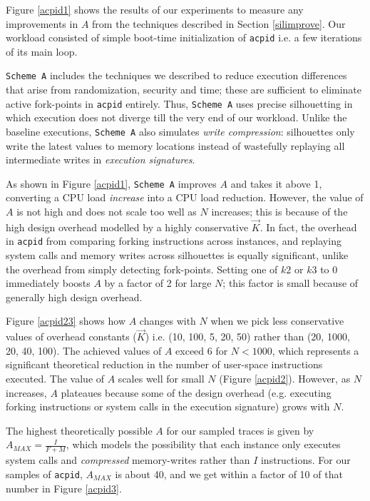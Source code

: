 \newpage
\noindent Figure \ref {acpid1} shows the results of our experiments
to measure any improvements in $A$ from the techniques described in Section \ref{silimprove}.
Our workload consisted of simple boot-time initialization of \texttt{acpid}
i.e. a few iterations of its main loop. 

\texttt{Scheme A} includes the techniques we described to reduce
execution differences that arise from randomization, security and time;
these are sufficient to eliminate active fork-points in \texttt{acpid}
entirely. Thus, \texttt{Scheme A} uses precise silhouetting
in which execution does not diverge till the very end of our workload.
Unlike the baseline executions, \texttt{Scheme A} also simulates {\em write compression}:
silhouettes only write the latest values to memory locations instead of wastefully
replaying all intermediate writes  in {\em execution signatures}.

As shown in Figure \ref{acpid1}, \texttt{Scheme A} improves $A$ and
takes it above 1, converting a CPU load {\em increase}
into a CPU load reduction. However, the value of $A$ is not high
and does not scale too well as $N$ increases;
this is because of the high design overhead 
modelled by a highly conservative $\vec K$. In fact, the overhead 
in \texttt{acpid} from comparing forking instructions across instances, and replaying system calls and memory writes
across silhouettes is equally significant, unlike
the overhead from simply detecting fork-points.
Setting one of $k2$ or $k3$ to 0 immediately boosts $A$ by a factor of 2 for large $N$;
this factor is small because of generally high design overhead.

Figure \ref{acpid23} shows how $A$ changes with $N$ when we pick less conservative
values of overhead constants ($\vec K$) i.e. (10, 100, 5, 20, 50) 
rather than (20, 1000, 20, 40, 100). The achieved values of $A$ 
exceed 6 for $N < 1000$, which represents a significant
theoretical reduction in the number of user-space instructions
executed. The value of $A$ scales well for small $N$
(Figure \ref{acpid2}).
However, as $N$ increases, $A$ plateaues because some
of the design overhead (e.g. executing forking instructions or system
calls in the execution signature) grows with $N$. 

The highest theoretically possible
$A$ for our sampled traces is given by $A_{MAX} = \frac{I}{F+M}$,
which models the possibility that each instance only
executes system calls and {\em compressed} memory-writes
rather than $I$ instructions. For our samples of \texttt{acpid}, $A_{MAX}$ 
is about 40, and we get within a factor of 10 of that number in Figure \ref{acpid3}. 

